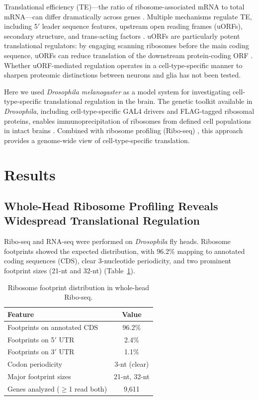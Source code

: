 \documentclass[11pt]{article}
\begin{document}
Translational efficiency (TE)---the ratio of ribosome-associated mRNA to total mRNA---can differ dramatically across genes \citep{ingolia2009ribosome, ingolia2011ribosome}. Multiple mechanisms regulate TE, including 5$'$ leader sequence features, upstream open reading frames (uORFs), secondary structure, and trans-acting factors \citep{sonenberg2009regulation, hinnebusch2014uorf, jackson2010mechanism}. uORFs are particularly potent translational regulators: by engaging scanning ribosomes before the main coding sequence, uORFs can reduce translation of the downstream protein-coding ORF \citep{uorf_regulation2016}. Whether uORF-mediated regulation operates in a cell-type-specific manner to sharpen proteomic distinctions between neurons and glia has not been tested.

Here we used \textit{Drosophila melanogaster} as a model system for investigating cell-type-specific translational regulation in the brain. The genetic toolkit available in \textit{Drosophila}, including cell-type-specific GAL4 drivers \citep{nsynbgal4_driver2010, repo_gal4_2008} and FLAG-tagged ribosomal proteins, enables immunoprecipitation of ribosomes from defined cell populations in intact brains \citep{trap_method2008}. Combined with ribosome profiling (Ribo-seq) \citep{ingolia2009ribosome}, this approach provides a genome-wide view of cell-type-specific translation.

\section{Results}

\subsection{Whole-Head Ribosome Profiling Reveals Widespread Translational Regulation}

Ribo-seq and RNA-seq were performed on \textit{Drosophila} fly heads. Ribosome footprints showed the expected distribution, with 96.2\% mapping to annotated coding sequences (CDS), clear 3-nucleotide periodicity, and two prominent footprint sizes (21-nt and 32-nt) (Table~\ref{tab:footprints}).

\begin{table}[H]
\centering
\caption{Ribosome footprint distribution in whole-head Ribo-seq.}
\label{tab:footprints}
\begin{tabular}{lc}
\toprule
Feature & Value \\
\midrule
Footprints on annotated CDS & 96.2\% \\
Footprints on 5$'$ UTR & 2.4\% \\
Footprints on 3$'$ UTR & 1.1\% \\
Codon periodicity & 3-nt (clear) \\
Major footprint sizes & 21-nt, 32-nt \\
Genes analyzed ($\geq$1 read both) & 9,611 \\
\bottomrule
\end{tabular}
\end{table}
\end{document}

